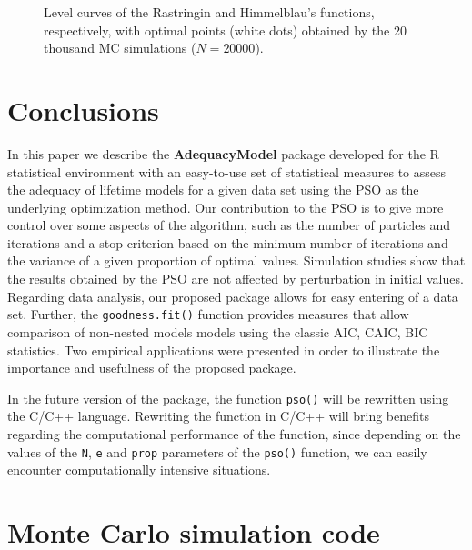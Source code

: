 \documentclass[10pt,letterpaper]{article}
\begin{document}
\begin{figure}[H]
	\centering
	
	\caption{Level curves of the Rastringin and Himmelblau's functions, respectively, with optimal points (white dots) obtained by the 20 thousand MC simulations ($N = 20000$).}
	
\end{figure}


\section{Conclusions}

In this paper we describe the \textbf{AdequacyModel} package developed for the \textsc{R} statistical environment
with an easy-to-use set of statistical measures to assess the adequacy of lifetime models for a given data set using the PSO as the underlying optimization method.
Our contribution to the PSO is to give more control over some aspects of the algorithm,
such as the number of particles and iterations and a stop criterion based on the minimum number of iterations
and the variance of a given proportion of optimal values.
Simulation studies show that the results obtained by the PSO are not affected by perturbation in initial values.
Regarding data analysis, our proposed package allows for easy entering of a data set.
Further, the \texttt{goodness.fit()} function provides measures that allow comparison of non-nested models models using the classic AIC, CAIC, BIC statistics.
Two empirical applications were presented in order to illustrate the importance and usefulness of the proposed package.

In the future version of the package, the function \texttt{pso()} will be rewritten using the \textsc{C}/\textsc{C++} language. Rewriting the function in \textsc{C}/\textsc{C++} will bring benefits regarding the computational performance of the function, since depending on the values of the \texttt{N}, \texttt{e} and \texttt{prop} parameters of the \texttt{pso()} function, we can easily encounter computationally intensive situations.







\appendix


\section{Monte Carlo simulation code}
\label{code:simulation_mc}
\end{document}
